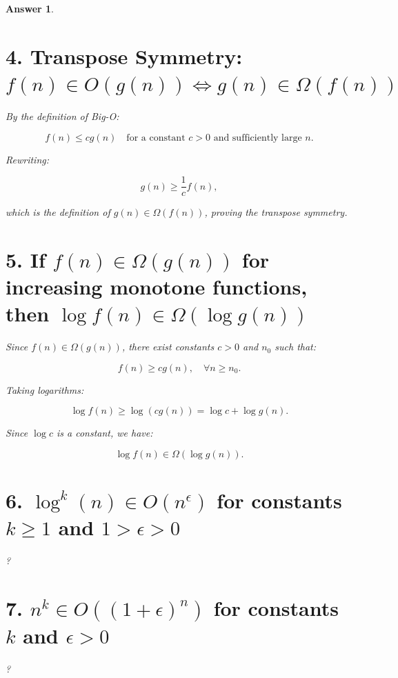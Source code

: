 \documentclass[a4paper]{article}
\theoremstyle{remarksStyle}
\theoremstyle{questionStyle}
\theoremstyle{answerStyle}
\newtheorem{answer}{Answer}
\begin{document}
\begin{answer}
\section*{4. Transpose Symmetry: \( f(n) \in O(g(n)) \iff g(n) \in \Omega(f(n)) \)}

By the definition of Big-O:

\[
f(n) \leq c g(n) \quad \text{for a constant } c > 0 \text{ and sufficiently large } n.
\]

Rewriting:

\[
g(n) \geq \frac{1}{c} f(n),
\]

which is the definition of \( g(n) \in \Omega(f(n)) \), proving the transpose symmetry. 

\section*{5. If \( f(n) \in \Omega(g(n)) \) for increasing monotone functions, then \( \log f(n) \in \Omega(\log g(n)) \)}

Since \( f(n) \in \Omega(g(n)) \), there exist constants \( c > 0 \) and \( n_0 \) such that:

\[
f(n) \geq c g(n), \quad \forall n \geq n_0.
\]

Taking logarithms:

\[
\log f(n) \geq \log (c g(n)) = \log c + \log g(n).
\]

Since \( \log c \) is a constant, we have:

\[
\log f(n) \in \Omega(\log g(n)).
\]

\section*{6. \( \log^k(n) \in O(n^\epsilon) \) for constants \( k \geq 1 \) and \( 1 > \epsilon > 0 \) }

?

\section*{7. \( n^k \in O((1+\epsilon)^n) \) for constants \( k \) and \( \epsilon > 0 \) }
?
\end{answer}

\newpage
\end{document}
